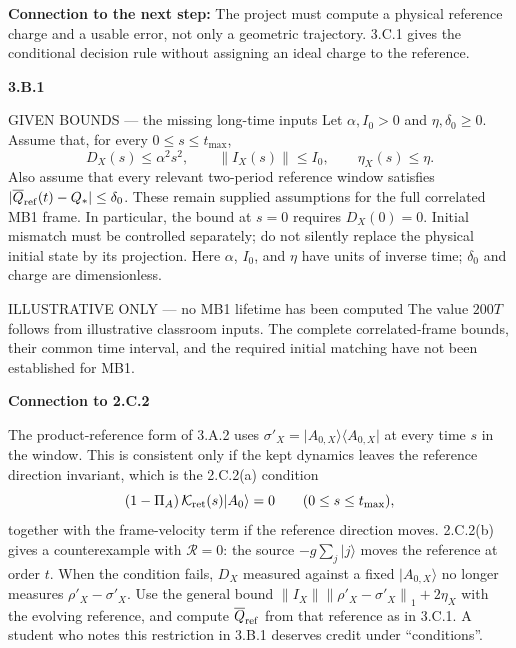\documentclass[11pt,a4paper]{article}
\newcommand{\ket}[1]{\lvert #1\rangle}
\newcommand{\bra}[1]{\langle #1\rvert}
\newcommand{\norm}[1]{\left\lVert #1\right\rVert}
\newcommand{\Qbar}{\overline Q}
\newcommand{\smallheading}[1]{\par\Needspace{6\baselineskip}\medskip\textbf{#1}\par}
\begin{document}
{\small\textbf{Connection to the next step:} The project must compute a physical reference charge and a usable error, not only a geometric trajectory. 3.C.1 gives the conditional decision rule without assigning an ideal charge to the reference.}\par
\par\medskip\textbf{3.B.1}\par
\begin{redbox}{GIVEN BOUNDS --- the missing long-time inputs}
Let $\alpha,I_0>0$ and $\eta,\delta_0\geq0$. Assume that, for every $0\leq s\leq t_{\max}$,
\[
D_X(s)\leq\alpha^2s^2,\qquad
\norm{I_X(s)}\leq I_0,\qquad\eta_X(s)\leq\eta.
\]
Also assume that every relevant two-period reference window satisfies
$|\Qbar_{\rm ref}(t)-Q_*|\leq\delta_0$.
These remain supplied assumptions for the full correlated MB1 frame. In particular, the bound at $s=0$ requires $D_X(0)=0$. Initial mismatch must be controlled separately; do not silently replace the physical initial state by its projection. Here $\alpha$, $I_0$, and $\eta$ have units of inverse time; $\delta_0$ and charge are dimensionless.
\end{redbox}
\begin{redbox}{ILLUSTRATIVE ONLY --- no MB1 lifetime has been computed}
The value $200T$ follows from illustrative classroom inputs. The complete correlated-frame bounds, their common time interval, and the required initial matching have not been established for MB1.
\end{redbox}
\smallheading{Connection to 2.C.2}
The product-reference form of 3.A.2 uses $\sigma'_X=\ket{A_{0,X}}\bra{A_{0,X}}$ at every time $s$ in the window. This is consistent only if the kept dynamics leaves the reference direction invariant, which is the 2.C.2(a) condition
\[
(1-\Pi_A)\,\mathcal K_{\rm ret}(s)\ket{A_0}=0\qquad(0\le s\le t_{\max}),
\]
together with the frame-velocity term if the reference direction moves. 2.C.2(b) gives a counterexample with $\mathcal R=0$: the source $-g\sum_j\ket j$ moves the reference at order $t$. When the condition fails, $D_X$ measured against a fixed $\ket{A_{0,X}}$ no longer measures $\rho'_X-\sigma'_X$. Use the general bound $\norm{I_X}\norm{\rho'_X-\sigma'_X}_1+2\eta_X$ with the evolving reference, and compute $\Qbar_{\rm ref}$ from that reference as in 3.C.1. A student who notes this restriction in 3.B.1 deserves credit under ``conditions''.
\end{document}
